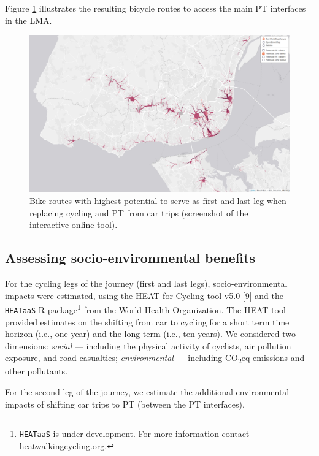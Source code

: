 \documentclass[runningheads]{llncs}
\begin{document}
Figure \ref{fig:map2} illustrates the resulting bicycle routes to access
the main PT interfaces in the LMA.

\begin{figure}

{\centering \includegraphics[width=0.8\linewidth,]{img/map2} 

}

\caption{Bike routes with highest potential to serve as first and last leg when replacing cycling and PT from car trips (screenshot of the interactive online tool).}\label{fig:map2}
\end{figure}

\hypertarget{assessing-socio-environmental-benefits}{%
\subsection{Assessing socio-environmental
benefits}\label{assessing-socio-environmental-benefits}}

For the cycling legs of the journey (first and last legs),
socio-environmental impacts were estimated, using the HEAT for Cycling
tool v5.0 {[}9{]} and the
\href{https://github.com/HEAT-WHO/HEAT_heatr_api}{\texttt{HEATaaS} R
package}\footnote{\texttt{HEATaaS} is under development. For more
  information contact
  \href{https://heatwalkingcycling.org}{heatwalkingcycling.org}.} from
the World Health Organization. The HEAT tool provided estimates on the
shifting from car to cycling for a short term time horizon (i.e., one
year) and the long term (i.e., ten years). We considered two dimensions:
\emph{social} --- including the physical activity of cyclists, air
pollution exposure, and road casualties; \emph{environmental} ---
including CO\textsubscript{2}eq emissions and other pollutants.

For the second leg of the journey, we estimate the additional
environmental impacts of shifting car trips to PT (between the PT
interfaces).
\end{document}
